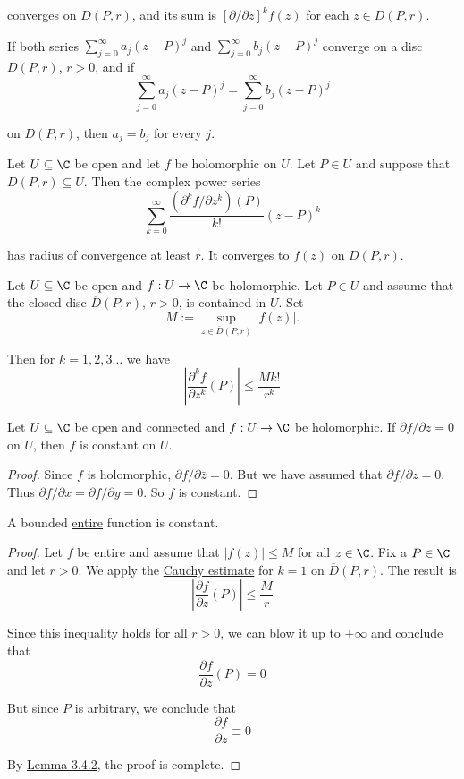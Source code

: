 converges on $D(P,r)$, and its sum is $[\partial/\partial z]^kf(z)$ for each
$z\in D(P,r)$.

\label{ea8c930}

If both series $\sum_{j=0}^\infty a_j(z-P)^j$ and $\sum_{j=0}^\infty
b_j(z-P)^j$ converge on a disc $D(P,r)$, $r>0$, and if
$$
  \sum_{j=0}^\infty a_j(z-P)^j=\sum_{j=0}^\infty b_j(z-P)^j
$$

on $D(P,r)$, then $a_j=b_j$ for every $j$.

\label{b43209d}

Let $U\subseteq\C$ be open and let $f$ be holomorphic on $U$. Let $P\in U$ and
suppose that $D(P,r)\subseteq U$. Then the complex power series
$$
  \sum_{k=0}^\infty\frac{(\partial^kf/\partial z^k)(P)}{k!}(z-P)^k
$$

has radius of convergence at least $r$. It converges to $f(z)$ on $D(P,r)$.

\label{a2d8611}

Let $U\subseteq\C$ be open and $f:U\to\C$ be holomorphic. Let $P\in U$ and
assume that the closed disc $\overline D(P,r)$, $r>0$, is contained in $U$. Set
$$
  M:=\sup_{z\in\overline D(P,r)}|f(z)|.
$$

Then for $k=1,2,3\ldots$ we have
$$
  \left|\frac{\partial^kf}{\partial z^k}(P)\right|\leq\frac{Mk!}{r^k}
$$

\label{c2c7fd1}

Let $U\subseteq\C$ be open and connected and $f:U\to\C$ be holomorphic. If
$\partial f/\partial z=0$ on $U$, then $f$ is constant on $U$.

\begin{proof}
  Since $f$ is holomorphic, $\partial f/\partial\bar z=0$. But we have assumed
  that $\partial f/\partial z=0$. Thus $\partial f/\partial x=\partial f/\partial
  y=0$. So $f$ is constant.
\end{proof}

\label{cf6d8a9}

A bounded \href{d508dc8}{entire} function is constant.

\begin{proof}
  Let $f$ be entire and assume that $|f(z)|\leq M$ for all $z\in\C$. Fix a
  $P\in\C$ and let $r>0$. We apply the \href{a2d8611}{Cauchy estimate} for $k=1$
  on $\overline D(P,r)$. The result is
  $$
    \left|\frac{\partial f}{\partial z}(P)\right|\leq\frac Mr
  $$

  Since this inequality holds for all $r>0$, we can blow it up to $+\infty$ and
  conclude that
  $$
    \frac{\partial f}{\partial z}(P)=0
  $$

  But since $P$ is arbitrary, we conclude that
  $$
    \frac{\partial f}{\partial z}\equiv0
  $$

  By \href{c2c7fd1}{Lemma 3.4.2}, the proof is complete.
\end{proof}

